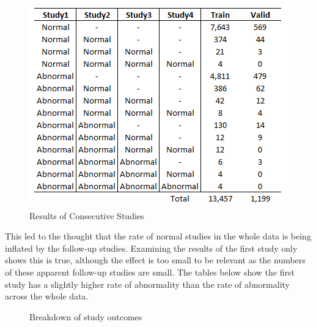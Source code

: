 \documentclass[11pt]{article} %
\theoremstyle{plain}
\theoremstyle{definition}
\begin{document}
\begin{figure}[!ht]
    \centering    
    \caption{Results of Consecutive Studies}
    \label{fig:ConsecutiveStudyResults}
    \includegraphics[scale=0.7]{MURA-Breakdowns/ConsecutiveStudyResults.PNG}
\end{figure}
\FloatBarrier
\noindent
This led to the thought that the rate of normal studies in the whole data is being inflated by the follow-up studies. Examining the results of the first study only shows this is true, although the effect is too small to be relevant as the numbers of these apparent follow-up studies are small. The tables below show the first study has a slightly higher rate of abnormality than the rate of abnormality across the whole data.
\begin{figure}[!ht]
\centering
{}
\caption{Breakdown of study outcomes}
\label{fig:Outcomes_Breakdown}
\end{figure}
\FloatBarrier
\end{document}
